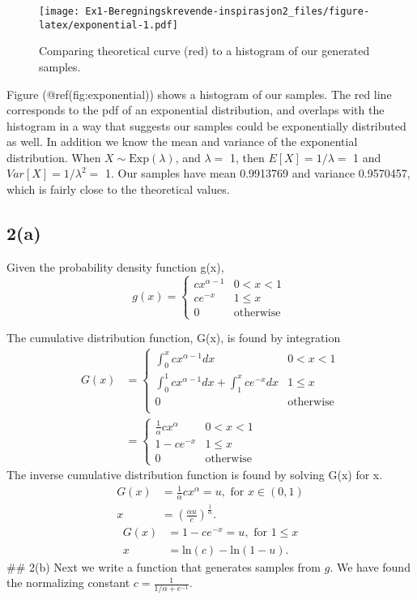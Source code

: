 \documentclass[
]{article}
\begin{document}
\begin{figure}
\centering
\texttt{[image: Ex1-Beregningskrevende-inspirasjon2\_files/figure-latex/exponential-1.pdf]}
\caption{Comparing theoretical curve (red) to a histogram of our
generated samples.}
\end{figure}

Figure (@ref(fig:exponential)) shows a histogram of our samples. The red
line corresponds to the pdf of an exponential distribution, and overlaps
with the histogram in a way that suggests our samples could be
exponentially distributed as well. In addition we know the mean and
variance of the exponential distribution. When
\(X\sim\text{Exp}(\lambda)\), and \(\lambda=\) 1, then
\(E[X]=1/\lambda=\) 1 and \(Var[X]=1/\lambda^2=\) 1. Our samples have
mean 0.9913769 and variance 0.9570457, which is fairly close to the
theoretical values.

\hypertarget{a}{%
\subsection{2(a)}\label{a}}

Given the probability density function g(x), \[
g(x)= \begin{cases} 
      cx^{\alpha-1} & 0< x< 1 \\
      ce^{-x} & 1\leq x \\
      0 & \text{otherwise }
   \end{cases}
\]

The cumulative distribution function, G(x), is found by integration \[
\begin{aligned}
G(x)&=\begin{cases}
\int_0^x cx^{\alpha-1}dx &0<x<1\\
\int_0^1 cx^{\alpha-1}dx+\int_1^xce^{-x}dx &1\le x\\
0 & \text{otherwise}\\
\end{cases}\\
&=\begin{cases}
\frac{1}{\alpha}cx^{\alpha} & 0<x<1\\
1-ce^{-x} & 1\le x\\
0 &\text{otherwise}
\end{cases}
\end{aligned}
\] The inverse cumulative distribution function is found by solving G(x)
for x. \[
\begin{aligned}
G(x)&=\frac{1}{\alpha}cx^{\alpha}=u,  \text{  for }x \in (0,1)\\
x&=(\frac{\alpha u}{c})^{\frac{1}{\alpha}}.
\end{aligned}
\] \[
\begin{aligned}
G(x)&=1-ce^{-x}=u,  \text{  for }1\le x\\
x&=\text{ln}(c)-\text{ln}(1-u).
\end{aligned}
\] \#\# 2(b) Next we write a function that generates samples from \(g\).
We have found the normalizing constant
\(c=\frac{1}{1/\alpha + e^{-1}}\).
\end{document}
